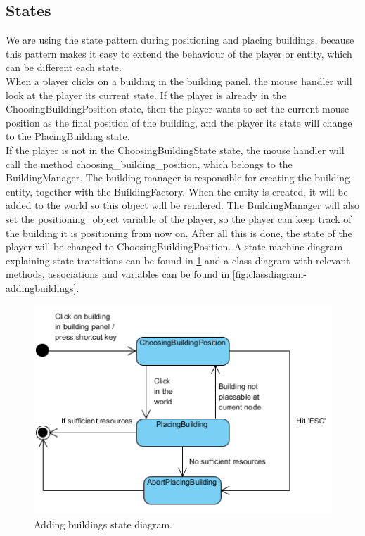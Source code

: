 \subsection{States}
We are using the state pattern during positioning and placing buildings, because this pattern makes it easy to extend the behaviour of the player or entity, which can be different each state.\\
When a player clicks on a building in the building panel, the mouse handler will look at the player its current state. If the player is already in the ChoosingBuildingPosition state, then the player wants to 
set the current mouse position as the final position of the building, and the player its state will change to the  PlacingBuilding state.\\
If the player is not in the ChoosingBuildingState state, the mouse  handler will call the method 
choosing\_building\_position, which belongs to the BuildingManager. The building manager is responsible for creating the building entity, together with the BuildingFactory.
When the entity is created, it will be added to the world so this object will be rendered.
The BuildingManager will also set the positioning\_object variable of the player, so the player can keep track of the building it is positioning from now on. After all this is done, the state of the player will be changed to ChoosingBuildingPosition.
A state machine diagram explaining state transitions can be found in \cref{fig:statediagram-addingbuildings} and a class diagram with relevant methods, associations and variables can be found in \cref{fig:classdiagram-addingbuildings}.

\begin{figure}[!htb]
    \centering
    \includegraphics{res/adding-buildings/States-StateDiagram.png}
    \caption{Adding buildings state diagram.}\label{fig:statediagram-addingbuildings}
\end{figure}

